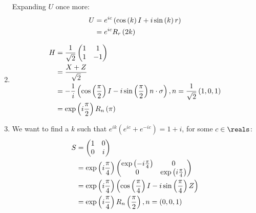 \begin{enumerate}
%
Expanding $U$ once more:
%
\begin{align}
U &= e^{ic} \left( \cos \left( k \right) I + i \sin \left( k \right) r \right) \\
&= e^{ic} R_r \left( 2k \right)
\end{align}
%
\item \begin{align}
H &= \frac{1}{\sqrt{2}} \begin{pmatrix} 1 & 1 \\ 1 & -1 \end{pmatrix} \\
&= \frac{X + Z}{\sqrt{2}} \\
&= -\frac1i \left( \cos \left( \frac{\pi}{2} \right) I - i \sin \left( \frac{\pi}{2} \right) n \cdot \sigma \right), n = \frac{1}{\sqrt{2}} \left( 1, 0, 1 \right) \\
&= \exp \left( i \frac{\pi}{2} \right) R_n \left( \pi \right)
\end{align}
%
\item We want to find a $k$ such that $e^{ik} \left( e^{ic} + e^{-ic} \right) = 1 + i$, for some $c \in \reals$:
%
\begin{align}
S &= \begin{pmatrix} 1 & 0 \\ 0 & i \end{pmatrix} \\
&= \exp \left( i \frac{\pi}{4} \right) \begin{pmatrix} \exp \left( -i \frac{\pi}{4} \right) & 0 \\ 0 & \exp \left( i \frac{\pi}{4} \right) \end{pmatrix} \\
&= \exp \left( i \frac{\pi}{4} \right) \left( \cos \left( \frac{\pi}{4} \right) I - i \sin \left( \frac{\pi}{4} \right) Z \right) \\
&= \exp \left( i \frac{\pi}{4} \right) R_n \left( \frac{\pi}{2} \right), n = \left(0, 0, 1 \right)
\end{align}
\end{enumerate}
\endgroup
